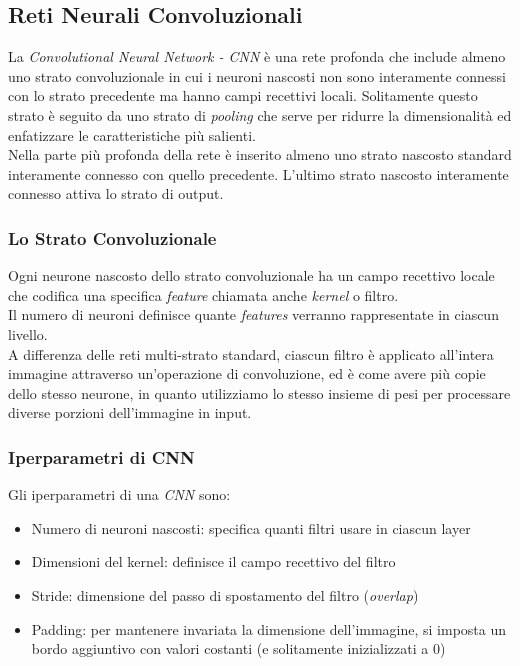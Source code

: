 \documentclass[12pt, a4paper]{article}
\begin{document}
\subsection{Reti Neurali Convoluzionali}
La \textit{Convolutional Neural Network - CNN} è una rete profonda che include almeno uno strato convoluzionale in cui i neuroni nascosti non sono interamente connessi con lo strato precedente ma hanno campi recettivi locali. Solitamente questo strato è seguito da uno strato di \textit{pooling} che serve per ridurre la dimensionalità ed enfatizzare le caratteristiche più salienti.\\
Nella parte più profonda della rete è inserito almeno uno strato nascosto standard interamente connesso con quello precedente. L'ultimo strato nascosto interamente connesso attiva lo strato di output.
\subsubsection{Lo Strato Convoluzionale}
Ogni neurone nascosto dello strato convoluzionale ha un campo recettivo locale che codifica una specifica \textit{feature} chiamata anche \textit{kernel} o filtro.\\
Il numero di neuroni definisce quante \textit{features} verranno rappresentate in ciascun livello.\\
A differenza delle reti multi-strato standard, ciascun filtro è applicato all'intera immagine attraverso un'operazione di convoluzione, ed è come avere più copie dello stesso neurone, in quanto utilizziamo lo stesso insieme di pesi per processare diverse porzioni dell'immagine in input.
\subsubsection{Iperparametri di CNN}
Gli iperparametri di una \textit{CNN} sono:
\begin{itemize}
    \item Numero di neuroni nascosti: specifica quanti filtri usare in ciascun layer
    \item Dimensioni del kernel: definisce il campo recettivo del filtro
    \item Stride: dimensione del passo di spostamento del filtro (\textit{overlap})
    \item Padding: per mantenere invariata la dimensione dell'immagine, si imposta un bordo aggiuntivo con valori costanti (e solitamente inizializzati a 0)
\end{itemize}
\end{document}
